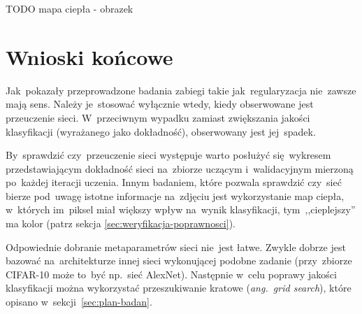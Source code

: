 TODO mapa ciepła - obrazek

\section{Wnioski końcowe}
Jak~pokazały przeprowadzone badania zabiegi takie jak~regularyzacja nie~zawsze mają sens. Należy je~stosować wyłącznie
wtedy, kiedy obserwowane jest przeuczenie sieci. W~przeciwnym wypadku zamiast zwiększania jakości klasyfikacji
(wyrażanego jako dokładność), obserwowany jest jej~spadek.

By~sprawdzić czy~przeuczenie sieci występuje warto posłużyć się~wykresem przedstawiającym dokładność sieci na~zbiorze
uczącym i~walidacyjnym mierzoną po~każdej iteracji uczenia. Innym badaniem, które pozwala sprawdzić czy~sieć bierze
pod~uwagę istotne informacje na~zdjęciu jest wykorzystanie map ciepła, w~których im~piksel miał większy wpływ
na~wynik klasyfikacji, tym~,,cieplejszy'' ma kolor (patrz sekcja \ref{sec:weryfikacja-poprawnosci}).

Odpowiednie dobranie metaparametrów sieci nie~jest łatwe. Zwykle dobrze jest bazować na~architekturze innej sieci
wykonującej podobne zadanie (przy~zbiorze \mbox{CIFAR-10} może to~być np.~sieć AlexNet). Następnie w~celu poprawy jakości
klasyfikacji można wykorzystać przeszukiwanie kratowe (\textit{ang.~grid search}), które opisano
w~sekcji~\ref{sec:plan-badan}.
